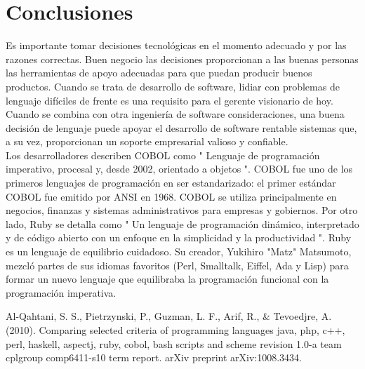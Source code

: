 \documentclass[twoside,twocolumn]{article}
\begin{document}
\section{Conclusiones}
Es importante tomar decisiones tecnológicas en el momento adecuado y por las razones correctas. Buen negocio
las decisiones proporcionan a las buenas personas las herramientas de apoyo adecuadas para que puedan producir buenos productos.
Cuando se trata de desarrollo de software, lidiar con problemas de lenguaje difíciles de frente es una
requisito para el gerente visionario de hoy. Cuando se combina con otra ingeniería de software
consideraciones, una buena decisión de lenguaje puede apoyar el desarrollo de software rentable
sistemas que, a su vez, proporcionan un soporte empresarial valioso y confiable.\\
Los desarrolladores describen COBOL como " Lenguaje de programación imperativo, procesal y, desde 2002, orientado a objetos ". COBOL fue uno de los primeros lenguajes de programación en ser estandarizado: el primer estándar COBOL fue emitido por ANSI en 1968. COBOL se utiliza principalmente en negocios, finanzas y sistemas administrativos para empresas y gobiernos. Por otro lado, Ruby se detalla como " Un lenguaje de programación dinámico, interpretado y de código abierto con un enfoque en la simplicidad y la productividad ". Ruby es un lenguaje de equilibrio cuidadoso. Su creador, Yukihiro "Matz" Matsumoto, mezcló partes de sus idiomas favoritos (Perl, Smalltalk, Eiffel, Ada y Lisp) para formar un nuevo lenguaje que equilibraba la programación funcional con la programación imperativa.


\begin{thebibliography}{99} %

 
\newblock Al-Qahtani, S. S., Pietrzynski, P., Guzman, L. F., Arif, R., & Tevoedjre, A. (2010). Comparing selected criteria of programming languages java, php, c++, perl, haskell, aspectj, ruby, cobol, bash scripts and scheme revision 1.0-a team cplgroup comp6411-s10 term report. arXiv preprint arXiv:1008.3434.
\end{thebibliography}

\end{document}
